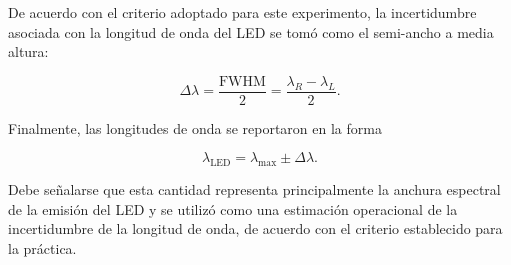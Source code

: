 De acuerdo con el criterio adoptado para este experimento, la
incertidumbre asociada con la longitud de onda del LED se tomó como el
semi-ancho a media altura:

\begin{equation}
    \Delta\lambda
    =
    \frac{\mathrm{FWHM}}{2}
    =
    \frac{\lambda_R-\lambda_L}{2}.
\end{equation}

Finalmente, las longitudes de onda se reportaron en la forma

\begin{equation}
    \lambda_{\mathrm{LED}}
    =
    \lambda_{\max}\pm\Delta\lambda.
\end{equation}

Debe señalarse que esta cantidad representa principalmente la anchura
espectral de la emisión del LED y se utilizó como una estimación
operacional de la incertidumbre de la longitud de onda, de acuerdo con
el criterio establecido para la práctica.

